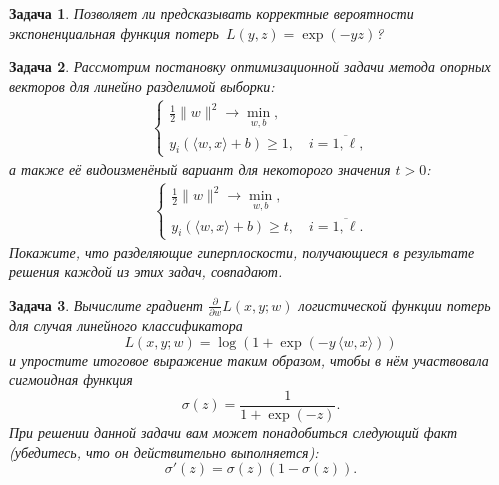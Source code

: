 \documentclass[12pt,fleqn]{article}
\newtheorem{esProblem}{Задача}
\begin{document}
\begin{esProblem}
    Позволяет ли предсказывать корректные вероятности экспоненциальная функция потерь~$L(y, z) = \exp(-yz)$?
\end{esProblem}

\begin{esProblem}
    Рассмотрим постановку оптимизационной задачи метода опорных векторов для линейно разделимой выборки:
    \begin{align*}
        \begin{cases}
            \frac{1}{2} \| w\|^2 \to \min_{w, b},\\
            y_i (\langle w, x\rangle + b) \ge 1, \quad i = \overline{1, \ell},
        \end{cases}
    \end{align*}
    а также её видоизменёный вариант для некоторого значения $t > 0$:
\begin{align*}
        \begin{cases}
            \frac{1}{2} \| w\|^2 \to \min_{w, b},\\
            y_i (\langle w, x\rangle + b) \ge t, \quad i = \overline{1, \ell}.
        \end{cases}
    \end{align*}
     Покажите, что разделяющие гиперплоскости, получающиеся в результате решения каждой из этих задач, совпадают.
        
\end{esProblem}


\begin{esProblem}
    Вычислите градиент $\frac{\partial}{\partial w}L(x, y; w)$ логистической функции потерь для случая линейного классификатора
    $$L(x, y; w) = \log (1 + \exp(-y \, \langle w, x\rangle))$$
    и упростите итоговое выражение таким образом, чтобы в нём участвовала сигмоидная функция 
    $$\sigma(z) = \frac{1}{1 + \exp(-z)}.$$
    При решении данной задачи вам может понадобиться следующий факт (убедитесь, что он действительно выполняется):
    $$\sigma'(z) = \sigma(z) (1- \sigma(z)).$$ 
\end{esProblem}
\end{document}
